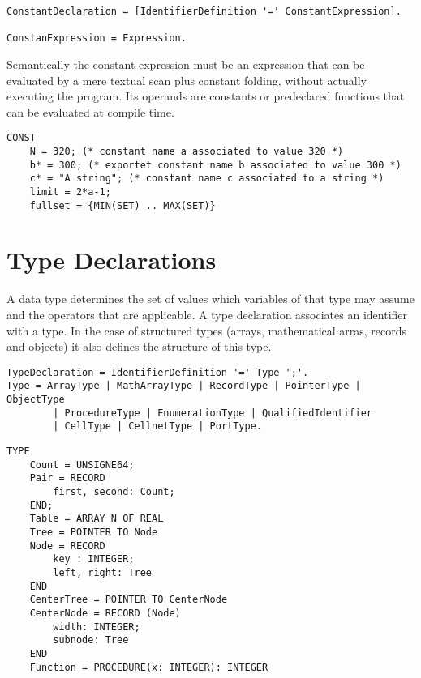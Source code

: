 \documentclass[a4wide,11pt]{article}
\begin{document}
\begin{lstlisting}[style = ebnf]
ConstantDeclaration = [IdentifierDefinition '=' ConstantExpression].

ConstanExpression = Expression.
\end{lstlisting}

Semantically the constant expression must be an expression that can be evaluated by a mere textual scan plus constant folding, without actually executing the program.
Its operands are constants or predeclared functions that can be evaluated at compile time.

\begin{annotation}
\begin{lstlisting}[style=example]
CONST
	N = 320; (* constant name a associated to value 320 *)
	b* = 300; (* exportet constant name b associated to value 300 *)
	c* = "A string"; (* constant name c associated to a string *)
	limit = 2*a-1;
	fullset = {MIN(SET) .. MAX(SET)}
\end{lstlisting}
\end{annotation}


\section{Type Declarations}
A data type determines the set of values which variables of that type may assume and the operators that are applicable.
A type declaration associates an identifier with a type.
In the case of structured types (arrays, mathematical arras, records and objects) it also defines the structure of this type.

\begin{lstlisting}[style = ebnf]
TypeDeclaration = IdentifierDefinition '=' Type ';'.
Type = ArrayType | MathArrayType | RecordType | PointerType | ObjectType
        | ProcedureType | EnumerationType | QualifiedIdentifier
        | CellType | CellnetType | PortType.
\end{lstlisting}

\begin{lstlisting}[style=example, caption=Examples of Type Declarations]
TYPE
	Count = UNSIGNE64;
	Pair = RECORD
		first, second: Count;
	END;
	Table = ARRAY N OF REAL
	Tree = POINTER TO Node
	Node = RECORD
		key : INTEGER;
		left, right: Tree
	END
	CenterTree = POINTER TO CenterNode
	CenterNode = RECORD (Node)
		width: INTEGER;
		subnode: Tree
	END
	Function = PROCEDURE(x: INTEGER): INTEGER
\end{lstlisting}
\end{document}
